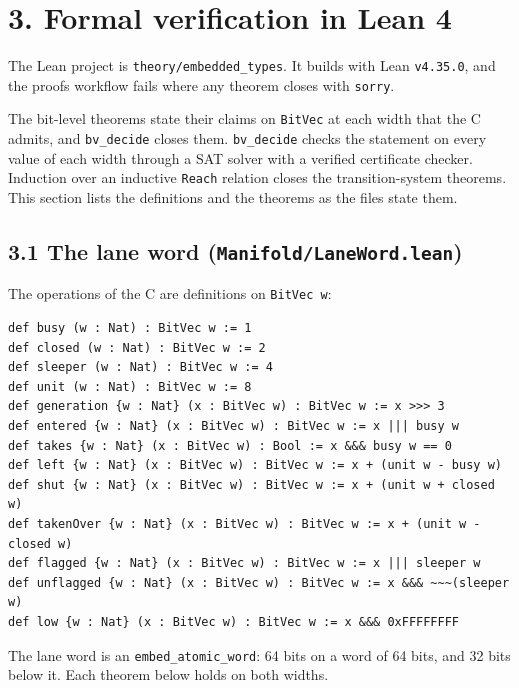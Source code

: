 \section{\texorpdfstring{3. Formal verification in Lean 4}{3. Formal verification in Lean 4}}

The Lean project is \texttt{theory/\allowbreak{}embedded\_\allowbreak{}types}. It builds with Lean \texttt{v4.\allowbreak{}35.\allowbreak{}0}, and the proofs workflow fails where any theorem closes with \texttt{sorry}.

The bit-level theorems state their claims on \texttt{Bit\allowbreak{}Vec} at each width that the C admits, and \texttt{bv\_\allowbreak{}decide} closes them. \texttt{bv\_\allowbreak{}decide} checks the statement on every value of each width through a SAT solver with a verified certificate checker. Induction over an inductive \texttt{Reach} relation closes the transition-system theorems. This section lists the definitions and the theorems as the files state them.

\subsection{\texorpdfstring{3.1 The lane word (\texttt{Manifold/\allowbreak{}Lane\allowbreak{}Word.\allowbreak{}lean})}{3.1 The lane word (Manifold/LaneWord.lean)}}

The operations of the C are definitions on \texttt{Bit\allowbreak{}Vec w}:

\begin{Verbatim}
def busy (w : Nat) : BitVec w := 1
def closed (w : Nat) : BitVec w := 2
def sleeper (w : Nat) : BitVec w := 4
def unit (w : Nat) : BitVec w := 8
def generation {w : Nat} (x : BitVec w) : BitVec w := x >>> 3
def entered {w : Nat} (x : BitVec w) : BitVec w := x ||| busy w
def takes {w : Nat} (x : BitVec w) : Bool := x &&& busy w == 0
def left {w : Nat} (x : BitVec w) : BitVec w := x + (unit w - busy w)
def shut {w : Nat} (x : BitVec w) : BitVec w := x + (unit w + closed w)
def takenOver {w : Nat} (x : BitVec w) : BitVec w := x + (unit w - closed w)
def flagged {w : Nat} (x : BitVec w) : BitVec w := x ||| sleeper w
def unflagged {w : Nat} (x : BitVec w) : BitVec w := x &&& ~~~(sleeper w)
def low {w : Nat} (x : BitVec w) : BitVec w := x &&& 0xFFFFFFFF
\end{Verbatim}

The lane word is an \texttt{embed\_\allowbreak{}atomic\_\allowbreak{}word}: 64 bits on a word of 64 bits, and 32 bits below it. Each theorem below holds on both widths.

